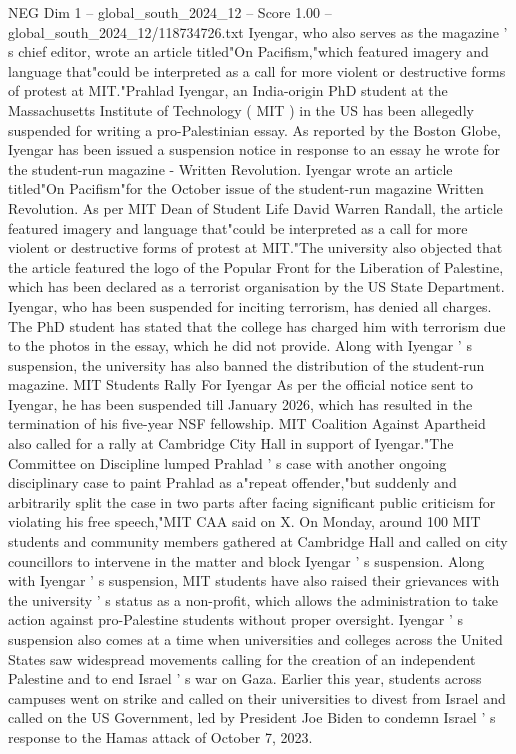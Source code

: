 \begin{textsample}{NEG Dim 1 – global\_south\_2024\_12 – Score 1.00 – global\_south\_2024\_12/118734726.txt}  \label{ex:f1_neg_265}
Iyengar, who also serves as the magazine ' s chief editor, wrote an article titled"On Pacifism,"which featured imagery and language that"could be interpreted as a call for more violent or destructive forms of protest at MIT."Prahlad Iyengar, an India-origin PhD student at the Massachusetts Institute of Technology ( MIT ) in the US has been allegedly suspended for writing a pro-Palestinian essay.
As reported by the Boston Globe, Iyengar has been issued a suspension notice in response to an essay he wrote for the student-run magazine - Written Revolution.
Iyengar wrote an article titled"On Pacifism"for the October issue of the student-run magazine Written Revolution.
As per MIT Dean of Student Life David Warren Randall, the article featured imagery and language that"could be interpreted as a call for more violent or destructive forms of protest at MIT."The university also objected that the article featured the logo of the Popular Front for the Liberation of Palestine, which has been declared as a terrorist organisation by the US State Department.
Iyengar, who has been suspended for inciting terrorism, has denied all charges.
The PhD student has stated that the college has charged him with terrorism due to the photos in the essay, which he did not provide.
Along with Iyengar ' s suspension, the university has also banned the distribution of the student-run magazine.
MIT Students Rally For Iyengar As per the official notice sent to Iyengar, he has been suspended till January 2026, which has resulted in the termination of his five-year NSF fellowship.
MIT Coalition Against Apartheid also called for a rally at Cambridge City Hall in support of Iyengar."The Committee on Discipline lumped Prahlad ' s case with another ongoing disciplinary case to paint Prahlad as a"repeat offender,"but suddenly and arbitrarily split the case in two parts after facing significant public criticism for violating his free speech,"MIT CAA said on X.
On Monday, around 100 MIT students and community members gathered at Cambridge Hall and called on city councillors to intervene in the matter and block Iyengar ' s suspension.
Along with Iyengar ' s suspension, MIT students have also raised their grievances with the university ' s status as a non-profit, which allows the administration to take action against pro-Palestine students without proper oversight.
Iyengar ' s suspension also comes at a time when universities and colleges across the United States saw widespread movements calling for the creation of an independent Palestine and to end Israel ' s war on Gaza.
Earlier this year, students across campuses went on strike and called on their universities to divest from Israel and called on the US Government, led by President Joe Biden to condemn Israel ' s response to the Hamas attack of October 7, 2023.

\end{textsample}
